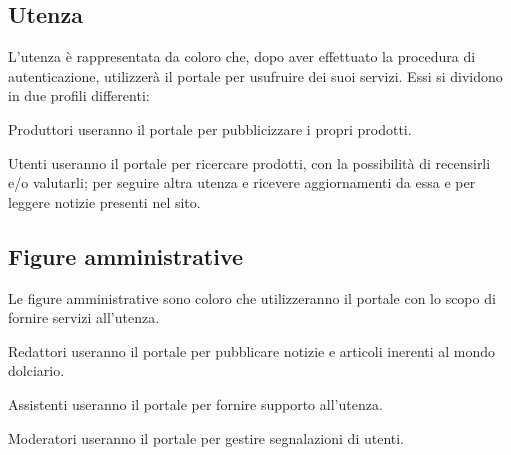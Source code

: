 \subsection{Utenza}
\label{sub:utenza}
L'utenza è rappresentata da coloro che, dopo aver effettuato la procedura di autenticazione, utilizzerà il portale per usufruire dei suoi servizi. Essi si dividono in due profili differenti:
\begin{descriptionInd}
    \item[Produttori] useranno il portale per pubblicizzare i propri prodotti.

    \item[Utenti] useranno il portale per ricercare prodotti, con la possibilità di recensirli e/o valutarli; per seguire altra utenza e ricevere aggiornamenti da essa e per leggere notizie presenti nel sito.
\end{descriptionInd}




\subsection{Figure amministrative}
\label{sub:figureamministrative}
Le figure amministrative sono coloro che utilizzeranno il portale con lo scopo di fornire servizi all'utenza.
\begin{descriptionInd}
    \item[Redattori] useranno il portale per pubblicare notizie e articoli inerenti al mondo dolciario.   
    \item[Assistenti] useranno il portale per fornire supporto all'utenza.
    \item[Moderatori] useranno il portale per gestire segnalazioni di utenti.
\end{descriptionInd}


